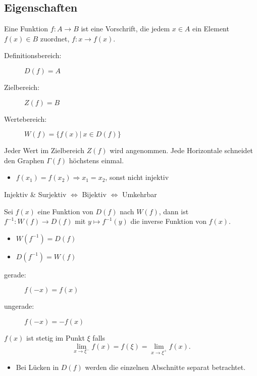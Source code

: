 \subsection{Eigenschaften}
    Eine Funktion $f : A \to B$ ist eine Vorschrift, die jedem $x \in A$ ein Element $f(x) \in B$ zuordnet, $f: x \to f(x)$.
    \begin{description}
        \item[Definitionsbereich:] $D(f) = A$
        \item[Zielbereich:] $Z(f) = B$
        \item[Wertebereich:] $W(f) = \{ f(x) \vert \ x \in D(f)\}$   
    \end{description}
        Jeder Wert im Zielbereich $Z(f)$ wird angenommen.
        Jede Horizontale schneidet den Graphen $\Gamma(f)$ höchstens einmal.
        \begin{itemize}
            \item $f(x_1) = f(x_2) \Rightarrow x_1 = x_2$, sonst nicht injektiv
        \end{itemize}
        \begin{center}
            Injektiv \& Surjektiv $\Leftrightarrow$ Bijektiv $\Leftrightarrow$ Umkehrbar
        \end{center}
        Sei $f(x)$ eine Funktion von $D(f)$ nach $W(f)$, dann ist $f^{-1}: W(f) \to D(f)$ mit $y \mapsto f^{-1}(y)$ die inverse Funktion von $f(x)$.
        \begin{itemize}
            \item $W(f^{-1}) = D(f)$
            \item $D(f^{-1}) = W(f)$
        \end{itemize}
        \begin{description}
            \item[gerade:]\phantom{as} $f(-x) = f(x)$ 
            \item[ungerade:] $f(-x) = -f(x)$ 
        \end{description}
        $f(x)$ ist stetig im Punkt $\xi$ falls
        $$
            \lim_{x\to\xi^-} f(x) = f(\xi) = \lim_{x\to\xi^+} f(x).
        $$
        \begin{itemize}
            \item Bei Lücken in $D(f)$ werden die einzelnen Abschnitte separat betrachtet.
        \end{itemize}
